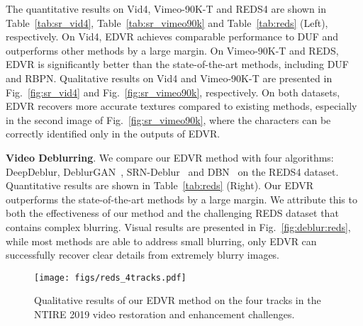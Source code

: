 \documentclass[10pt,twocolumn,letterpaper]{article}
\begin{document}
The quantitative results on Vid4, Vimeo-90K-T and REDS4 are shown in Table~\ref{tab:sr_vid4}, Table~\ref{tab:sr_vimeo90k} and Table~\ref{tab:reds} (Left), respectively. On Vid4, EDVR achieves comparable performance to DUF and outperforms other methods by a large margin. On Vimeo-90K-T and REDS, EDVR is significantly better than the state-of-the-art methods, including DUF and RBPN. 
Qualitative results on Vid4 and Vimeo-90K-T are presented in Fig.~\ref{fig:sr_vid4} and Fig.~\ref{fig:sr_vimeo90k}, respectively. On both datasets, EDVR recovers more accurate textures compared to existing methods, especially in the second image of Fig.~\ref{fig:sr_vimeo90k}, where the characters can be correctly identified only in the outputs of EDVR.


\noindent\textbf{Video Deblurring}.
We compare our EDVR method with four algorithms: DeepDeblur\cite{nah2017deep}, DeblurGAN~\cite{kupyn2018deblurgan}, SRN-Deblur~\cite{tao2018srndeblur} and DBN~\cite{su2017deep} on the REDS4 dataset.
Quantitative results are shown in Table~\ref{tab:reds} (Right). Our EDVR outperforms the state-of-the-art methods by a large margin. We attribute this to both the effectiveness of our method and the challenging REDS dataset that contains complex blurring.
Visual results are presented in Fig.~\ref{fig:deblur:reds}, while most methods are able to address small blurring, only EDVR can successfully recover clear details from extremely blurry images.

\begin{figure*}[!th]
	\vspace{-1cm}
	\begin{center}
		\texttt{[image: figs/reds\_4tracks.pdf]}
		\vspace{-0.6cm}
		\caption{Qualitative results of our EDVR method on the four tracks in the NTIRE 2019 video restoration and enhancement challenges.}
		\label{fig:reds_4tracks}
		\vspace{-0.4cm}
	\end{center}
	\vspace{-0.4cm}
\end{figure*}
\end{document}
